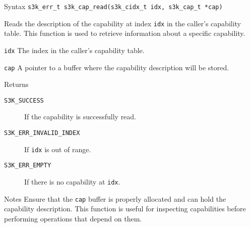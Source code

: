\documentclass[a4paper,11pt]{article}
\newcommand{\syscall}[1]{\texttt{#1}}
\newenvironment{syscalldoc}[1]{
  \begin{tcolorbox}[breakable,title=\subsection{\syscall{#1}}]
  \begin{description}[leftmargin=!,style=nextline,noitemsep]
}{
  \end{description}
  \end{tcolorbox}
}
\begin{document}
\begin{syscalldoc}{s3k\_cap\_read}
  \item[Syntax] \lstinline{s3k_err_t s3k_cap_read(s3k_cidx_t idx, s3k_cap_t *cap)}
  \item[Description] Reads the description of the capability at index \verb|idx| in the caller's capability table. This function is used to retrieve information about a specific capability.
  \item[Parameters]
    \begin{description}
      \item[]
      \item[\texttt{idx}] The index in the caller's capability table.
      \item[\texttt{cap}] A pointer to a buffer where the capability description will be stored.
    \end{description}
  \item[Returns]
    \begin{description}
      \item[]
      \item[\texttt{S3K\_SUCCESS}] If the capability is successfully read.
      \item[\texttt{S3K\_ERR\_INVALID\_INDEX}] If \verb|idx| is out of range.
      \item[\texttt{S3K\_ERR\_EMPTY}] If there is no capability at \verb|idx|.
    \end{description}
  \item[Notes] Ensure that the \verb|cap| buffer is properly allocated and can hold the capability description. This function is useful for inspecting capabilities before performing operations that depend on them.
\end{syscalldoc}
\end{document}
